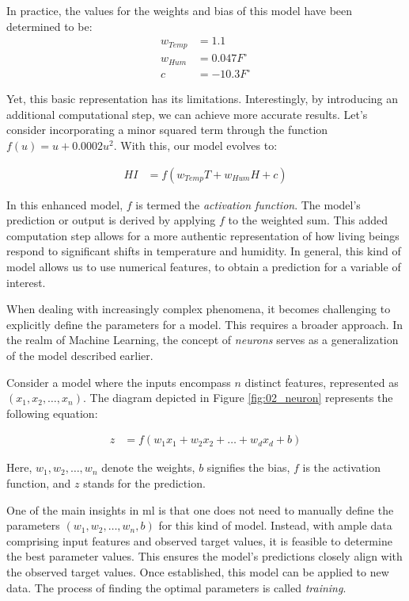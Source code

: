 In practice, the values for the weights and bias of this model have been determined to be:
\begin{align*}
w_{Temp} & = 1.1\\
w_{Hum} &= 0.047 F^\circ \\
c &= -10.3 F^\circ
\end{align*}

Yet, this basic representation has its limitations. Interestingly, by introducing an additional computational step, we can achieve more accurate results. Let's consider incorporating a minor squared term through the function $f(u) = u + 0.0002 u^2$. With this, our model evolves to:

\begin{align*}
HI &= f(w_{Temp} T + w_{Hum} H + c)
\end{align*}

In this enhanced model, $f$ is termed the \emph{activation function}. The model's prediction or output is derived by applying $f$ to the weighted sum. This added computation step allows for a more authentic representation of how living beings respond to significant shifts in temperature and humidity. 
In general, this kind of model allows us to use numerical features, to obtain a prediction for a variable of interest.

\label{02_nn_neurons}




When dealing with increasingly complex phenomena, it becomes challenging to explicitly define the parameters for a model. This requires a broader approach. In the realm of Machine Learning, the concept of \emph{neurons} serves as a generalization of the model described earlier.



Consider a model where the inputs encompass $n$ distinct features, represented as $(x_1, x_2,\ldots,x_n)$. The diagram depicted in Figure \ref{fig:02_neuron} represents the following equation:

\begin{align*}
z &= f(w_1 x_1 + w_2 x_2 + \ldots + w_d x_d + b)
\end{align*}

Here, $w_1, w_2,\ldots,w_n$ denote the weights, $b$ signifies the bias, $f$ is the activation function, and $z$ stands for the prediction.

One of the main insights in \gls{ml} is that one does not need to manually define the parameters $(w_1, w_2,\ldots,w_n,b)$ for this kind of model.
Instead, with ample data comprising input features and observed target values, it is feasible to determine the best parameter values. This ensures the model's predictions closely align with the observed target values. Once established, this model can be applied to new data. The process of finding the optimal parameters is called \emph{training}.

